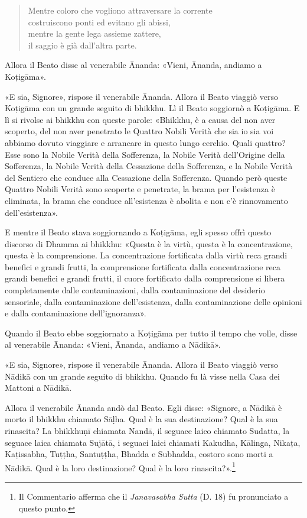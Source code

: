 \begin{quote}
Mentre coloro che vogliono attraversare la corrente \\
costruiscono ponti ed evitano gli abissi, \\
mentre la gente lega assieme zattere, \\
il saggio è già dall’altra parte.
\end{quote}



Allora il Beato disse al venerabile Ānanda: «Vieni, Ānanda, andiamo a
Koṭigāma».


«E sia, Signore», rispose il venerabile Ānanda. Allora il Beato viaggiò
verso Koṭigāma con un grande seguito di bhikkhu. Lì il Beato soggiornò a
Koṭigāma. E lì si rivolse ai bhikkhu con queste parole: «Bhikkhu, è a
causa del non aver scoperto, del non aver penetrato le Quattro Nobili
Verità che sia io sia voi abbiamo dovuto viaggiare e arrancare in questo
lungo cerchio. Quali quattro? Esse sono la Nobile Verità della
Sofferenza, la Nobile Verità dell’Origine della Sofferenza, la Nobile
Verità della Cessazione della Sofferenza, e la Nobile Verità del
Sentiero che conduce alla Cessazione della Sofferenza. Quando però
queste Quattro Nobili Verità sono scoperte e penetrate, la brama per
l’esistenza è eliminata, la brama che conduce all’esistenza è abolita e
non c’è rinnovamento dell’esistenza».


E mentre il Beato stava soggiornando a Koṭigāma, egli spesso offrì
questo discorso di Dhamma ai bhikkhu: «Questa è la virtù, questa è la
concentrazione, questa è la comprensione. La concentrazione fortificata
dalla virtù reca grandi benefici e grandi frutti, la comprensione
fortificata dalla concentrazione reca grandi benefici e grandi frutti,
il cuore fortificato dalla comprensione si libera completamente dalle
contaminazioni, dalla contaminazione del desiderio sensoriale, dalla
contaminazione dell’esistenza, dalla contaminazione delle opinioni e
dalla contaminazione dell’ignoranza».




Quando il Beato ebbe soggiornato a Koṭigāma per tutto il tempo che
volle, disse al venerabile Ānanda: «Vieni, Ānanda, andiamo a Nādikā».


«E sia, Signore», rispose il venerabile Ānanda. Allora il Beato viaggiò
verso Nādikā con un grande seguito di bhikkhu. Quando fu là visse nella
Casa dei Mattoni a Nādikā.


Allora il venerabile Ānanda andò dal Beato. Egli disse: «Signore, a
Nādikā è morto il bhikkhu chiamato Sāḷha. Qual è la sua destinazione?
Qual è la sua rinascita? La bhikkhuṇī chiamata Nandā, il seguace laico
chiamato Sudatta, la seguace laica chiamata Sujātā, i seguaci laici
chiamati Kakudha, Kālinga, Nikaṭa, Kaṭissabha, Tuṭṭha, Santuṭṭha, Bhadda
e Subhadda, costoro sono morti a Nādikā. Qual è la loro destinazione?
Qual è la loro rinascita?».\footnote{Il Commentario afferma che il \emph{Janavasabha Sutta} (D. 18) fu pronunciato a questo punto.}


